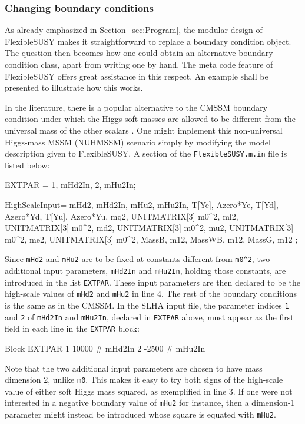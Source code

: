 \documentclass[final,3p,11pt,pdflatex]{elsarticle}
\makeatletter
\newcommand{\fs}{FlexibleSUSY\@\xspace}
\newcommand{\code}[1]{\lstinline|#1|}  %
\newcommand{\secref}[1]{Section~\ref{#1}}
\makeatother
\begin{document}
\subsubsection{Changing boundary conditions}

As already emphasized in \secref{sec:Program}, the modular design of
\fs makes it straightforward %
to replace a boundary condition object.
The question then becomes how
one could obtain an alternative boundary condition class,
apart from writing one by hand.
The meta code feature of \fs offers great assistance
in this respect.
An example shall be presented to illustrate how this works.

In the literature,
there is a popular alternative to the CMSSM boundary condition
under which the Higgs soft masses are allowed to be different from
the universal mass of the other scalars \cite{NUHM}.
One might implement
this non-universal Higgs-mass MSSM (NUHMSSM) scenario
simply by modifying the model description given to \fs.
A section of the \code{FlexibleSUSY.m.in} file is listed below:
\begin{numlstlisting}
EXTPAR = {{1, mHd2In}, {2, mHu2In}};

HighScaleInput={
  {mHd2, mHd2In}, {mHu2, mHu2In},
  {T[Ye], Azero*Ye}, {T[Yd], Azero*Yd}, {T[Yu], Azero*Yu},
  {mq2, UNITMATRIX[3] m0^2}, {ml2, UNITMATRIX[3] m0^2}, {md2, UNITMATRIX[3] m0^2},
  {mu2, UNITMATRIX[3] m0^2}, {me2, UNITMATRIX[3] m0^2},
  {MassB, m12}, {MassWB, m12}, {MassG, m12}
};
\end{numlstlisting}
Since \code{mHd2} and \code{mHu2} are to be fixed at constants
different from \code{m0^2},
two additional input parameters,
\code{mHd2In} and \code{mHu2In}, holding those constants,
are introduced in the list \code{EXTPAR}.
These input parameters are then declared to be the high-scale values of
\code{mHd2} and \code{mHu2} in line 4.
The rest of the boundary conditions is the same as in the CMSSM\@.
In the SLHA input file,
the parameter indices \code{1} and \code{2} of
\code{mHd2In} and \code{mHu2In}, declared in \code{EXTPAR} above,
must appear
as the first field in each line in the \code{EXTPAR} block:
\begin{numlstlisting}
Block EXTPAR
    1   10000                # mHd2In
    2   -2500                # mHu2In
\end{numlstlisting}
Note that the two additional input parameters are chosen to have
mass dimension 2, unlike \code{m0}.
This makes it easy to
try both signs of the high-scale value of either soft Higgs mass squared,
as exemplified in line 3.
If one were not interested in a negative boundary value of \code{mHu2}
for instance,
then a dimension-1 parameter %
might instead be introduced whose square is equated with \code{mHu2}.
\end{document}
